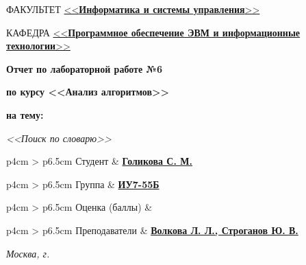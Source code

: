 \begin{titlepage}
	\begin{flushleft}
		\fontsize{12pt}{0.8\baselineskip}\selectfont 
		
		ФАКУЛЬТЕТ \uline{<<\textbf{Информатика и системы управления}>> \hfill}
		
		КАФЕДРА \uline{\mbox{\hspace{4mm}} <<\textbf{Программное обеспечение ЭВМ и информационные технологии}>> \hfill}
	\end{flushleft}

	\vfill

	\begin{center}
		\fontsize{20pt}{\baselineskip}\selectfont

		\textbf{Отчет по лабораторной работе №6}

		\textbf{по курсу <<Анализ алгоритмов>>}

		\textbf{на тему:}
	\end{center}

	\begin{center}
		\fontsize{18pt}{0.6cm}\selectfont 
		
			\textit{<<Поиск по словарю>>}
		
	\end{center}

	\vfill

	\begin{table}[h!]
		\fontsize{12pt}{0.7\baselineskip}\selectfont
		
		\begin{signstabular}[0.55]{p{4cm} > {\centering\arraybackslash}p{6.5cm}}
				Студент & \uline{\textbf{Голикова С. М.} \hfill} 
		\end{signstabular}
		
		\begin{signstabular}[0.55]{p{4cm} > {\centering\arraybackslash}p{6.5cm}}
				Группа & \uline{\textbf{ИУ7-55Б} \hfill} 
		\end{signstabular}
		
		\begin{signstabular}[0.55]{p{4cm} > {\centering\arraybackslash}p{6.5cm}}
				Оценка (баллы) & \uline{\mbox{\hspace*{6.5cm}}} 
		\end{signstabular}
		
		\begin{signstabular}[0.55]{p{4cm} > {\centering\arraybackslash}p{6.5cm}}
				Преподаватели & \uline{\textbf{Волкова Л. Л., Строганов Ю. В.} \hfill}
		\end{signstabular}
	\end{table}
	
	\vfill

	\begin{center}
		\normalsize \textit{Москва, \the\year г.}
	\end{center}
\end{titlepage}